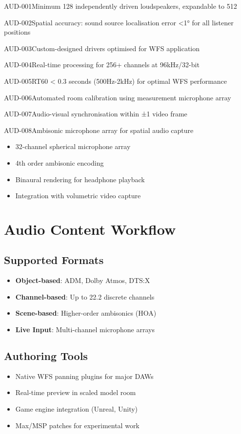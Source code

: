 \begin{requirement}{AUD-001}{Minimum 128 independently driven loudspeakers, expandable to 512}
\begin{requirement}{AUD-002}{Spatial accuracy: sound source localisation error <1° for all listener positions}
\begin{requirement}{AUD-003}{Custom-designed drivers optimised for WFS application}
\begin{requirement}{AUD-004}{Real-time processing for 256+ channels at 96kHz/32-bit}
\begin{requirement}{AUD-005}{RT60 < 0.3 seconds (500Hz-2kHz) for optimal WFS performance}
\begin{requirement}{AUD-006}{Automated room calibration using measurement microphone array}
\begin{requirement}{AUD-007}{Audio-visual synchronisation within ±1 video frame}
\begin{requirement}{AUD-008}{Ambisonic microphone array for spatial audio capture}

\begin{itemize}
    \item 32-channel spherical microphone array
    \item 4th order ambisonic encoding
    \item Binaural rendering for headphone playback
    \item Integration with volumetric video capture
\end{itemize}

\section{Audio Content Workflow}

\subsection{Supported Formats}

\begin{itemize}
    \item \textbf{Object-based}: ADM, Dolby Atmos, DTS:X
    \item \textbf{Channel-based}: Up to 22.2 discrete channels
    \item \textbf{Scene-based}: Higher-order ambisonics (HOA)
    \item \textbf{Live Input}: Multi-channel microphone arrays
\end{itemize}

\subsection{Authoring Tools}

\begin{itemize}
    \item Native WFS panning plugins for major DAWs
    \item Real-time preview in scaled model room
    \item Game engine integration (Unreal, Unity)
    \item Max/MSP patches for experimental work
\end{itemize}


\end{requirement}
\end{requirement}
\end{requirement}
\end{requirement}
\end{requirement}
\end{requirement}
\end{requirement}
\end{requirement}

